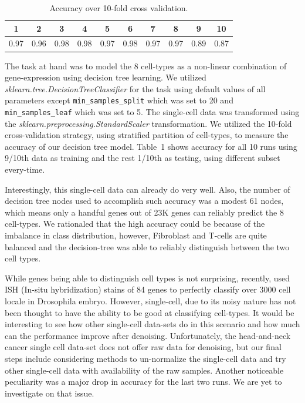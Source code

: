 \begin{table}[!hbtp]
\begin{tabular}{|c|c|c|c|c|c|c|c|c|c|}
\hline
\textbf{1} & \textbf{2} & \textbf{3} & \textbf{4} & \textbf{5} & \textbf{6} & \textbf{7} & \textbf{8} & \textbf{9} & \textbf{10} \\\hline
0.97 & 0.96 & 0.98 & 0.98 & 0.97 & 0.98 & 0.97 & 0.97 & 0.89 & 0.87 \\\hline
\end{tabular}
\caption{Accuracy over 10-fold cross validation.}
\end{table}  

The task at hand was to model the 8 cell-types as a non-linear combination of gene-expression using decision tree learning. We utilized \textit{sklearn.tree.DecisionTreeClassifier} for the task using default values of all parameters except \texttt{min\_samples\_split} which was set to 20 and \texttt{min\_samples\_leaf} which was set to 5. The single-cell data was transformed using the \textit{sklearn.preprocessing.StandardScaler} transformation. We utilized the 10-fold cross-validation strategy, using stratified partition of cell-types, to measure the accuracy of our decision tree model. Table~1 shows accuracy for all 10 runs using 9/10th data as training and the rest 1/10th as testing, using different subset every-time.

Interestingly, this single-cell data can already do very well. Also, the number of decision tree nodes used to accomplish such accuracy was a modest 61 nodes, which means only a handful genes out of 23K genes can reliably predict the 8 cell-types. We rationaled that the high accuracy could be because of the imbalance in class distribution, however, Fibroblast and T-cells are quite balanced and the decision-tree was able to reliably distinguish between the two cell types. 

While genes being able to distinguish cell types is not surprising, recently, \citet{karaiskos2017drosophila} used ISH (In-situ hybridization) stains of 84 genes to perfectly classify over 3000 cell locale in Drosophila embryo. However, single-cell, due to its noisy nature has not been thought to have the ability to be good at classifying cell-types. It would be interesting to see how other single-cell data-sets do in this scenario and how much can the performance improve after denoising. Unfortunately, the head-and-neck cancer single cell data-set does not offer raw data for denoising, but our final steps include considering methods to un-normalize the single-cell data and try other single-cell data with availability of the raw samples.  Another noticeable peculiarity was a major drop in accuracy for the last two runs. We are yet to investigate on that issue.